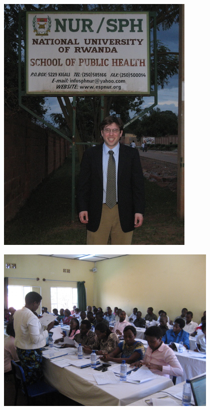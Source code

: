 \documentclass[aspectratio=169]{beamer}
\begin{document}
\begin{frame}

\begin{center}
\includegraphics[height=0.9\textheight]{figures/rwanda_matt_nur.jpg}
\end{center}

\end{frame}
\begin{frame}

\begin{center}
\includegraphics[width=0.8\textwidth]{figures/rwanda_interviewer_class.jpg}
\end{center}

\end{frame}
\end{document}

